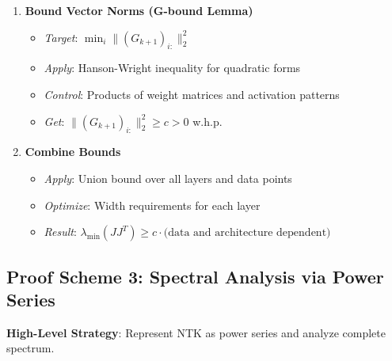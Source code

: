 \documentclass{article}
\newcommand{\evmin}[1]{\lambda_{\min}\left(#1\right)}
\begin{document}
\begin{enumerate}
    \item \textbf{Bound Vector Norms (G-bound Lemma)}
    \begin{itemize}
        \item \textit{Target}: $\min_i \|(G_{k+1})_{i:}\|_2^2$
        \item \textit{Apply}: Hanson-Wright inequality for quadratic forms
        \item \textit{Control}: Products of weight matrices and activation patterns
        \item \textit{Get}: $\|(G_{k+1})_{i:}\|_2^2 \geq c > 0$ w.h.p.
    \end{itemize}
    
    \item \textbf{Combine Bounds}
    \begin{itemize}
        \item \textit{Apply}: Union bound over all layers and data points
        \item \textit{Optimize}: Width requirements for each layer
        \item \textit{Result}: $\evmin{JJ^T} \geq c \cdot \text{(data and architecture dependent)}$
    \end{itemize}
\end{enumerate}

\subsection{Proof Scheme 3: Spectral Analysis via Power Series}

\textbf{High-Level Strategy}: Represent NTK as power series and analyze complete spectrum.
\end{document}
